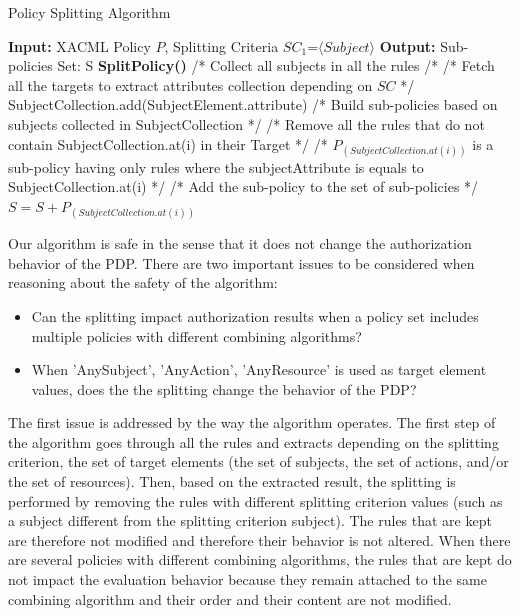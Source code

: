 \begin{algorithmic}
\begin{algorithm}[t]
\caption{Policy Splitting Algorithm}
\STATE \textbf{Input:} XACML Policy $P$, Splitting Criteria $SC_{1}$=$\langle Subject \rangle$
\STATE \textbf{Output:} Sub-policies Set: S
\STATE \textbf{SplitPolicy()}
\STATE /* Collect all subjects in all the rules /*
\STATE /* Fetch all the targets to extract attributes collection depending on $SC$ */
\STATE SubjectCollection.add(SubjectElement.attribute)
\ENDFOR
\ENDFOR
\STATE /* Build sub-policies based on subjects collected in SubjectCollection */
\STATE /* Remove all the rules that do not contain SubjectCollection.at(i) in their Target */
\ENDIF 
\ENDIF
\ENDFOR
\STATE /* $P_{(SubjectCollection.at(i))}$ is a sub-policy having only rules where the subjectAttribute is equals to SubjectCollection.at(i) */
\STATE /* Add the sub-policy to the set of sub-policies */
\STATE $S=S+P_{(SubjectCollection.at(i))}$
\ENDFOR
\end{algorithm}
\end{algorithmic}

Our algorithm is safe in the sense that it does not change the authorization behavior of the PDP. 
There are two important issues to be considered when reasoning about the safety of the algorithm:
\begin{itemize}
 \item Can the splitting impact authorization results when a policy set includes multiple policies with different combining algorithms?
 \item When 'AnySubject', 'AnyAction', 'AnyResource' is used as target element values, does the the splitting change the behavior of the PDP?
\end{itemize}
The first issue is addressed by the way the algorithm operates. The first step of the algorithm goes through all the rules and extracts 
depending on the splitting criterion, the set of target elements (the set of subjects, 
the set of actions, and/or the set of resources). Then, based on the extracted result, the splitting is performed by removing 
the rules with different splitting criterion values (such as a subject different from 
the splitting criterion subject). The rules that are kept are therefore not modified and therefore their behavior is not altered. When there 
are several policies with different combining algorithms, the rules that are kept do not impact the evaluation behavior 
because they remain attached to the same combining algorithm and their order and their content are not modified.


